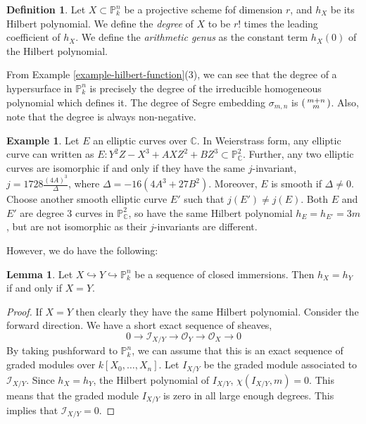 \documentclass[11pt]{amsart}
\newcommand{\sI}{{\mathcal I}}
\newcommand{\sO}{{\mathcal O}}
\newcommand{\C}{{\mathbb C}}
\renewcommand{\P}{{\mathbb P}}
\theoremstyle{definition}
\newtheorem{lemma}[theorem]{Lemma}
\newtheorem{definition}[theorem]{Definition}
\newtheorem{example}[theorem]{Example}
\begin{document}
\begin{definition}
	Let $X\subset \P_k^n$ be a projective scheme fof dimension $r$, and $h_X$ be its Hilbert polynomial. We define the \textit{degree} of $X$ to be $r!$ times the leading coefficient of $h_X$. We define the \textit{arithmetic genus} as the constant term $h_X(0)$ of the Hilbert polynomial.
\end{definition}

From Example \ref{example-hilbert-function}(3), we can see that the degree of a hypersurface in $\P_k^n$ is precisely the degree of the irreducible homogeneous polynomial which defines it. The degree of Segre embedding $\sigma_{m,n}$ is $\begin{psmallmatrix}
	m + n \\
	m
\end{psmallmatrix}$. Also, note that the degree is always non-negative.
\medskip

\begin{example}
	\label{example-elliptic-curves-same-hilbert-polynomial}
	Let $E$ an elliptic curves over $\C$. In Weierstrass form, any elliptic curve can written as $E : Y^2 Z - X^3+AX Z^2+B Z^3 \subset \P^2_\C$. Further, any two elliptic curves are isomorphic if and only if they have the same $j$-invariant, $j=1728 \frac{(4A)^3}{\Delta}$, where $\Delta = -16 (4A^3+27B^2)$. Moreover, $E$ is smooth if $\Delta \neq 0$.\\
	Choose another smooth elliptic curve $E'$ such that $j(E')\neq j(E)$. Both $E$ and $E'$ are degree $3$ curves in $\P^2_\C$, so have the same Hilbert polynomial $h_E=h_{E'}=3m$, but are not isomorphic as their $j$-invariants are different.
\end{example}

However, we do have the following:

\begin{lemma}
	\label{lemma-immersions-same-hilbert-polynomial}
	Let $X\hookrightarrow Y \hookrightarrow \P^n_k$ be a sequence of closed immersions. Then $h_X=h_Y$ if and only if $X=Y$.
\end{lemma}
\begin{proof}
	If $X=Y$ then clearly they have the same Hilbert polynomial.
	Consider the forward direction. We have a short exact sequence of sheaves,
	\[0\rightarrow \sI_{X/Y}\rightarrow \sO_Y \rightarrow \sO_X\rightarrow 0\]
	By taking pushforward to $\P^n_k$, we can assume that this is an exact sequence of graded modules over $k[X_0,\ldots,X_n]$. Let $I_{X/Y}$ be the graded module associated to $\sI_{X/Y}$.
	Since $h_X=h_Y$, the Hilbert polynomial of $I_{X/Y}$, $\chi(I_{X/Y},m)=0$. This means that the graded module $I_{X/Y}$ is zero in all large enough degrees. This implies that $\sI_{X/Y}=0$.
\end{proof}
\end{document}

